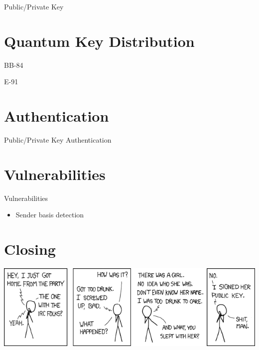 \documentclass{beamer}
\begin{document}
	\begin{frame}{Public/Private Key} %

	\end{frame}

	\section{Quantum Key Distribution}

	\begin{frame}{BB-84} %

	\end{frame}

	\begin{frame}{E-91} %

	\end{frame}

	\section{Authentication}

	\begin{frame}{Public/Private Key Authentication} %

	\end{frame}

	\section{Vulnerabilities}

	\begin{frame}{Vulnerabilities} %
		\begin{itemize}
			\item Sender basis detection
		\end{itemize}
	\end{frame}

	\section{Closing}

	\begin{frame}
		\begin{center}
		\includegraphics[width=\textwidth]{images/xkcd-responsible_behavior}
		\end{center}
	\end{frame}


	\begin{frame}[plain]\end{frame}
\end{document}
